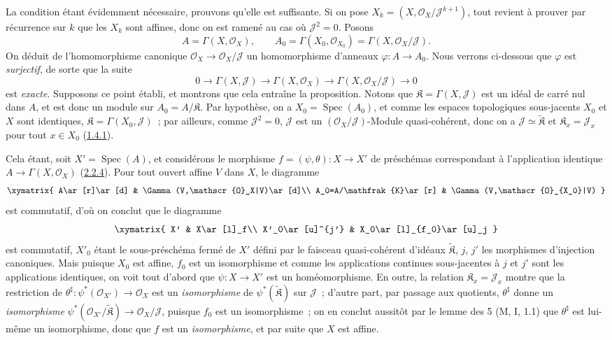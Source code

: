 La condition étant évidemment nécessaire, prouvons qu'elle est suffisante.
Si on pose $X_k=(X,\mathscr{O}_X/\mathscr{J}^{k+1})$, tout revient à prouver
par récurrence sur $k$ que les $X_k$ sont affines, donc on est ramené au cas
où $\mathscr{J}^2=0$. Posons
\[
  A=\Gamma(X,\mathscr{O}_X),\qquad
  A_0=\Gamma(X_0,\mathscr{O}_{X_0})
      =\Gamma(X,\mathscr{O}_X/\mathscr{J}).
\]
On déduit de l'homomorphisme canonique
$\mathscr{O}_X\to\mathscr{O}_X/\mathscr{J}$ un homomorphisme d'anneaux
$\varphi:A\to A_0$. Nous verrons ci-dessous que $\varphi$ est
\emph{surjectif}, de sorte que la suite
\[
  0\to\Gamma(X,\mathscr{J})\to\Gamma(X,\mathscr{O}_X)
  \to\Gamma(X,\mathscr{O}_X/\mathscr{J})\to 0
  \tag{5.1.9.1}\label{I.5.1.9.1-fr}
\]
est \emph{exacte}. Supposons ce point établi, et montrons que cela entraîne la
proposition. Notons que $\mathfrak{K}=\Gamma(X,\mathscr{J})$ est un idéal de
carré nul dans $A$, et est donc un module sur $A_0=A/\mathfrak{K}$. Par
hypothèse, on a $X_0=\operatorname{Spec}(A_0)$, et comme les espaces
topologiques sous-jacents $X_0$ et $X$ sont identiques,
$\mathfrak{K}=\Gamma(X_0,\mathscr{J})$~; par ailleurs, comme
$\mathscr{J}^2=0$, $\mathscr{J}$ est un
$(\mathscr{O}_X/\mathscr{J})$-Module quasi-cohérent, donc on a
$\mathscr{J}\simeq\widetilde{\mathfrak{K}}$ et
$\mathfrak{K}_x=\mathscr{J}_x$ pour tout $x\in X_0$
(\hyperref[I.1.4.1-fr]{1.4.1}).

Cela étant, soit $X'=\operatorname{Spec}(A)$, et considérons le morphisme
$f=(\psi,\theta):X\to X'$ de préschémas correspondant à l'application
identique $A\to\Gamma(X,\mathscr{O}_X)$
(\hyperref[I.2.2.4-fr]{2.2.4}). Pour tout ouvert affine $V$ dans $X$, le
diagramme
\[
  \xymatrix{
    A\ar[r]\ar[d] & \Gamma(V,\mathscr{O}_X|V)\ar[d]\\
    A_0=A/\mathfrak{K}\ar[r] & \Gamma(V,\mathscr{O}_{X_0}|V)
  }
\]
est commutatif, d'où on conclut que le diagramme
\[
  \xymatrix{
    X' & X\ar[l]_f\\
    X'_0\ar[u]^{j'} & X_0\ar[l]_{f_0}\ar[u]_j
  }
\]
est commutatif, $X'_0$ étant le sous-préschéma fermé de $X'$ défini par le
faisceau quasi-cohérent d'idéaux $\widetilde{\mathfrak{K}}$, $j$, $j'$ les
morphismes d'injection canoniques. Mais puisque $X_0$ est affine, $f_0$ est un
isomorphisme et comme les applications continues sous-jacentes à $j$ et $j'$
sont les applications identiques, on voit tout d'abord que
$\psi:X\to X'$ est un homéomorphisme. En outre, la relation
$\mathfrak{K}_x=\mathscr{J}_x$ montre que la restriction de
$\theta^\sharp:\psi^*(\mathscr{O}_{X'})\to\mathscr{O}_X$ est un
\emph{isomorphisme} de $\psi^*(\widetilde{\mathfrak{K}})$ sur $\mathscr{J}$~;
d'autre part, par passage aux quotients, $\theta^\sharp$ donne un
\emph{isomorphisme}
$\psi^*(\mathscr{O}_{X'}/\widetilde{\mathfrak{K}})
\to\mathscr{O}_X/\mathscr{J}$, puisque $f_0$ est un isomorphisme~; on en
conclut aussitôt par le lemme des 5 (M, I, 1.1) que $\theta^\sharp$ est
lui-même un isomorphisme, donc que $f$ est un \emph{isomorphisme}, et par suite
que $X$ est affine.

